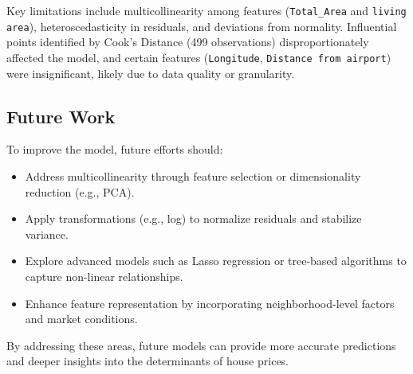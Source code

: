 \documentclass[11pt]{article}
\begin{document}
Key limitations include multicollinearity among features (\texttt{Total\_Area} and \texttt{living area}), heteroscedasticity in residuals, and deviations from normality. Influential points identified by Cook's Distance (499 observations) disproportionately affected the model, and certain features (\texttt{Longitude}, \texttt{Distance from airport}) were insignificant, likely due to data quality or granularity.

\subsection{Future Work}

To improve the model, future efforts should:
\begin{itemize}
    \item Address multicollinearity through feature selection or dimensionality reduction (e.g., PCA).
    \item Apply transformations (e.g., log) to normalize residuals and stabilize variance.
    \item Explore advanced models such as Lasso regression or tree-based algorithms to capture non-linear relationships.
    \item Enhance feature representation by incorporating neighborhood-level factors and market conditions.
\end{itemize}

By addressing these areas, future models can provide more accurate predictions and deeper insights into the determinants of house prices.



\nocite{*}
\printbibliography
\end{document}
